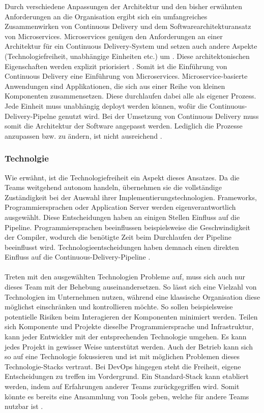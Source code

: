 Durch verschiedene Anpassungen der Architektur und den bisher erwähnten Anforderungen an die Organisation ergibt sich ein umfangreiches Zusammenwirken von Continuous Delivery und dem Softwarearchitekturansatz von Microservices. Microservices genügen den Anforderungen an einer Architektur für ein Continuous Delivery-System und setzen auch andere Aspekte (Technologiefreiheit, unabhängige Einheiten etc.) um \cite{Wolff.2016}. Diese architektonischen Eigenschaften werden explizit priorisiert \cite{continuousdelivery.2017}. Somit ist die Einführung von Continuous Delivery eine Einführung von Microservices. Microservice-basierte Anwendungen sind Applikationen, die sich aus einer Reihe von kleinen Komponenten zusammensetzen. Diese durchlaufen dabei alle als eigener Prozess. Jede Einheit muss unabhängig deployt werden können, wofür die Continuous-Delivery-Pipelne genutzt wird. Bei der Umsetzung von Continuous Delivery muss somit die Architektur der Software angepasst werden. Lediglich die Prozesse anzupassen bzw. zu ändern, ist nicht ausreichend \cite{Wolff.2016}.

\subsubsection{Technolgie}
Wie erwähnt, ist die Technologiefreiheit ein Aspekt dieses Ansatzes. Da die Teams weitgehend autonom handeln, übernehmen sie die vollständige Zuständigkeit bei der Auswahl ihrer Implementierungstechnologien. Frameworks, Programmiersprachen oder Application Server werden eigenverantwortlich ausgewählt. Diese Entscheidungen haben an einigen Stellen Einfluss auf die Pipeline. Programmiersprachen beeinflussen beispielsweise die Geschwindigkeit der Compiler, wodurch die benötigte Zeit beim Durchlaufen der Pipeline beeinflusst wird. Technologieentscheidungen haben demnach einen direkten Einfluss auf die Continuous-Delivery-Pipeline \cite{Wolff.2016}.\\ \\
Treten mit den ausgewählten Technologien Probleme auf, muss sich auch nur dieses Team mit der Behebung auseinandersetzen. So lässt sich eine Vielzahl von Technologien im Unternehmen nutzen, während eine klassische Organisation diese möglichst einschränken und kontrollieren möchte. So sollen beispielsweise potentielle Risiken beim Interagieren der Komponenten minimiert werden. Teilen sich Komponente und Projekte dieselbe Programmiersprache und Infrastruktur, kann jeder Entwickler mit der entsprechenden Technologie umgehen. Es kann jedes Projekt in gewisser Weise unterstützt werden. Auch der Betrieb kann sich so auf eine Technologie fokussieren und ist mit möglichen Problemen dieses Technologie-Stacks vertraut. Bei DevOps hingegen steht die Freiheit, eigene Entscheidungen zu treffen im Vordergrund. Ein Standard-Stack kann etabliert werden, indem auf Erfahrungen anderer Teams zurückgegriffen wird. Somit könnte es bereits eine Ansammlung von Tools geben, welche für andere Teams nutzbar ist \cite{Wolff.2016}. 

